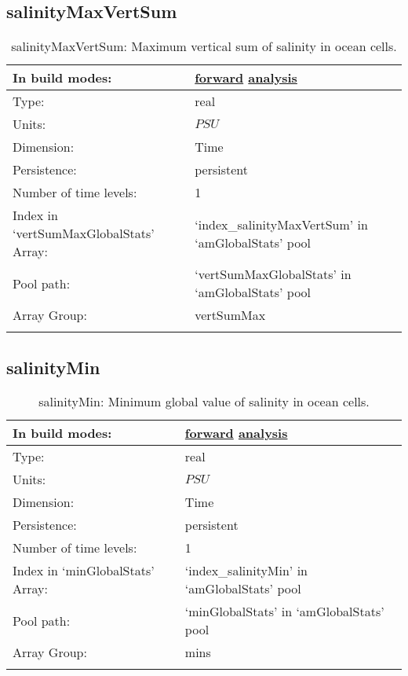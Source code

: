 \subsection[salinityMaxVertSum]{salinityMaxVertSum}
\label{subsec:var_sec_amGlobalStats_salinityMaxVertSum}
\begin{center}
\begin{longtable}{| p{2.0in} | p{4.0in} |}
        \hline 
        In build modes: & \hyperref[subsec:forward_var_tab_amGlobalStats]{forward} \hyperref[subsec:analysis_var_tab_amGlobalStats]{analysis} \\
        \hline 
        Type: & real \\
        \hline 
        Units: & $PSU$ \\
        \hline 
        Dimension: & Time \\
        \hline 
        Persistence: & persistent \\
        \hline 
        Number of time levels: & 1 \\
        \hline 
		 Index in `vertSumMaxGlobalStats' Array: & `index\_salinityMaxVertSum' in `amGlobalStats' pool \\
		 \hline 
            Pool path: & `vertSumMaxGlobalStats' in `amGlobalStats' pool \\
		 \hline 
		 Array Group: & vertSumMax \\
		 \hline 
    \caption{salinityMaxVertSum: Maximum vertical sum of salinity in ocean cells.}
\end{longtable}
\end{center}
\subsection[salinityMin]{salinityMin}
\label{subsec:var_sec_amGlobalStats_salinityMin}
\begin{center}
\begin{longtable}{| p{2.0in} | p{4.0in} |}
        \hline 
        In build modes: & \hyperref[subsec:forward_var_tab_amGlobalStats]{forward} \hyperref[subsec:analysis_var_tab_amGlobalStats]{analysis} \\
        \hline 
        Type: & real \\
        \hline 
        Units: & $PSU$ \\
        \hline 
        Dimension: & Time \\
        \hline 
        Persistence: & persistent \\
        \hline 
        Number of time levels: & 1 \\
        \hline 
		 Index in `minGlobalStats' Array: & `index\_salinityMin' in `amGlobalStats' pool \\
		 \hline 
            Pool path: & `minGlobalStats' in `amGlobalStats' pool \\
		 \hline 
		 Array Group: & mins \\
		 \hline 
    \caption{salinityMin: Minimum global value of salinity in ocean cells.}
\end{longtable}
\end{center}
